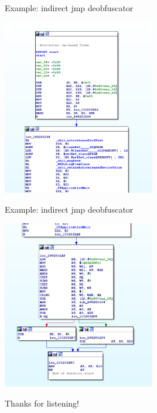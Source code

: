 \documentclass[10pt, compress]{beamer}
\begin{document}
\begin{frame}{Example: indirect jmp deobfuscator}
\begin{center}
  \includegraphics[width=0.5\textwidth]{images/deobf-2-ida2.png}
   \end{center}
\end{frame}

\begin{frame}{Example: indirect jmp deobfuscator}
\begin{center}
  \includegraphics[width=0.5\textwidth]{images/deobf-3-ida3.png}
   \end{center}
\end{frame}

\begin{frame}[standout]
Thanks for listening!
\end{frame}
\end{document}
